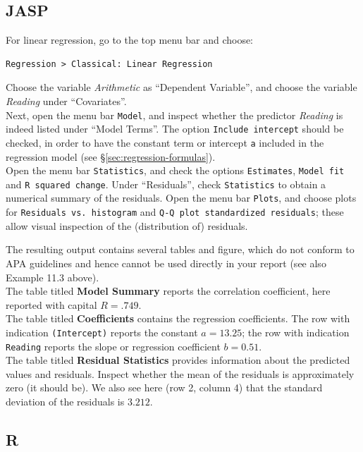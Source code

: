 \documentclass[
]{book}
\begin{document}
\hypertarget{jasp-7}{%
\subsection{JASP}\label{jasp-7}}

For linear regression, go to the top menu bar and choose:

\begin{verbatim}
Regression > Classical: Linear Regression
\end{verbatim}

Choose the variable \emph{Arithmetic} as ``Dependent Variable'', and choose the variable \emph{Reading} under ``Covariates''.\\
Next, open the menu bar \texttt{Model}, and inspect whether the predictor \emph{Reading} is indeed listed under ``Model Terms''. The option \texttt{Include\ intercept} should be checked, in order to have the constant term or intercept \texttt{a} included in the regression model (see §\ref{sec:regression-formulas}).\\
Open the menu bar \texttt{Statistics}, and check the options \texttt{Estimates}, \texttt{Model\ fit} and \texttt{R\ squared\ change}.
Under ``Residuals'', check \texttt{Statistics} to obtain a numerical summary of the residuals.
Open the menu bar \texttt{Plots}, and choose plots for \texttt{Residuals\ vs.\ histogram} and \texttt{Q-Q\ plot\ standardized\ residuals}; these allow visual inspection of the (distribution of) residuals.

The resulting output contains several tables and figure, which do not conform to APA guidelines and hence cannot be used directly in your report (see also Example 11.3 above).\\
The table titled \textbf{Model Summary} reports the correlation coefficient, here reported with capital \(R=.749\).\\
The table titled \textbf{Coefficients} contains the regression coefficients. The row with indication \texttt{(Intercept)} reports the constant \(a=13.25\); the row with indication \texttt{Reading} reports the slope or regression coefficient \(b=0.51\).\\
The table titled \textbf{Residual Statistics} provides information about the predicted values and residuals. Inspect whether the mean of the residuals is approximately zero (it should be). We also see here (row 2, column 4) that the standard deviation of the residuals is \(3.212\).

\hypertarget{r-7}{%
\subsection{R}\label{r-7}}
\end{document}
